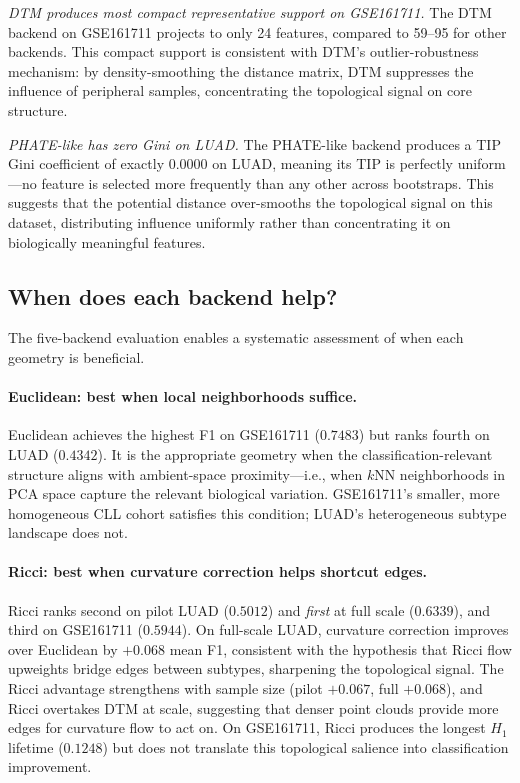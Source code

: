 \documentclass[11pt]{article}
\begin{document}
\textit{DTM produces most compact representative support on GSE161711.}
The DTM backend on GSE161711 projects to only 24 features, compared to 59--95 for other backends.
This compact support is consistent with DTM's outlier-robustness mechanism: by density-smoothing the distance matrix, DTM suppresses the influence of peripheral samples, concentrating the topological signal on core structure.

\textit{PHATE-like has zero Gini on LUAD.}
The PHATE-like backend produces a TIP Gini coefficient of exactly $0.0000$ on LUAD, meaning its TIP is perfectly uniform---no feature is selected more frequently than any other across bootstraps.
This suggests that the potential distance over-smooths the topological signal on this dataset, distributing influence uniformly rather than concentrating it on biologically meaningful features.

\subsection{When does each backend help?}

The five-backend evaluation enables a systematic assessment of when each geometry is beneficial.

\paragraph{Euclidean: best when local neighborhoods suffice.}
Euclidean achieves the highest F1 on GSE161711 ($0.7483$) but ranks fourth on LUAD ($0.4342$).
It is the appropriate geometry when the classification-relevant structure aligns with ambient-space proximity---i.e., when $k$NN neighborhoods in PCA space capture the relevant biological variation.
GSE161711's smaller, more homogeneous CLL cohort satisfies this condition; LUAD's heterogeneous subtype landscape does not.

\paragraph{Ricci: best when curvature correction helps shortcut edges.}
Ricci ranks second on pilot LUAD ($0.5012$) and \emph{first} at full scale ($0.6339$), and third on GSE161711 ($0.5944$).
On full-scale LUAD, curvature correction improves over Euclidean by $+0.068$ mean F1, consistent with the hypothesis that Ricci flow upweights bridge edges between subtypes, sharpening the topological signal.
The Ricci advantage strengthens with sample size (pilot $+0.067$, full $+0.068$), and Ricci overtakes DTM at scale, suggesting that denser point clouds provide more edges for curvature flow to act on.
On GSE161711, Ricci produces the longest $H_1$ lifetime ($0.1248$) but does not translate this topological salience into classification improvement.
\end{document}
